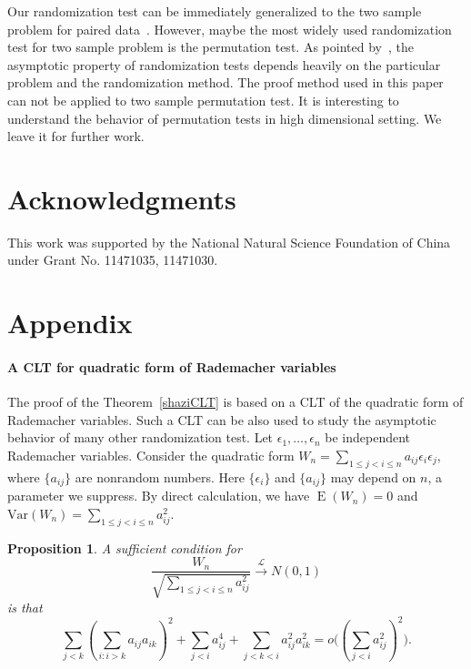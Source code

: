 \documentclass[review]{elsarticle}
\DeclareMathOperator{\myE}{E}
\theoremstyle{plain}
\newtheorem{proposition}{\quad\quad Proposition}
\theoremstyle{definition}
\theoremstyle{remark}
\begin{document}
Our randomization test can be immediately generalized to the two sample problem for paired data~\citep{Konietschke2014}.
However, maybe the most widely used randomization test for two sample problem is the permutation test.
As pointed by~\citet{Romano1990On}, the asymptotic property of randomization tests depends heavily on the particular problem and the randomization method.
The proof method used in this paper can not be applied to two sample permutation test.
 It is interesting to understand the behavior of permutation tests in high dimensional setting. We leave it for further work.


\section*{Acknowledgments}
{This work was supported by the National Natural Science Foundation of China under Grant No. 11471035, 11471030.
}

\section*{Appendix}
\paragraph{A CLT for quadratic form of Rademacher variables}
The proof of the Theorem~\ref{shaziCLT} is based on a CLT of the quadratic form of Rademacher variables. 
Such a CLT can be also used to study the asymptotic behavior of many other randomization test.
 Let $\epsilon_1,\ldots,\epsilon_n$ be independent Rademacher  variables. 
 Consider the quadratic form $W_n=\sum_{1\leq j<i\leq n} a_{ij}\epsilon_i \epsilon_j$, where $\{a_{ij}\}$ are nonrandom numbers. Here $\{\epsilon_i\}$ and $\{a_{ij}\}$ may depend on $n$, a parameter we suppress.
 By direct calculation, we have $\myE(W_n)=0$ and $\mathrm{Var}(W_n)=\sum_{1\leq j<i\leq n} a_{ij}^2$.

 \begin{proposition}\label{CLTprop}
     A sufficient condition for
     \begin{equation*}
         \frac{W_n}{\sqrt{\sum_{1\leq j<i\leq n} a_{ij}^2}}\xrightarrow{\mathcal{L}} N(0,1)
     \end{equation*}
     is that
     \begin{equation*}
         \sum_{j<k}{(\sum_{i:i>k}a_{ij}a_{ik})}^2+
         \sum_{j<i}a_{ij}^4+
         \sum_{j<k<i}a_{ij}^2 a_{ik}^2
         =o\big({(\sum_{j<i} a_{ij}^2)}^2\big).
     \end{equation*}
 \end{proposition}
\end{document}
